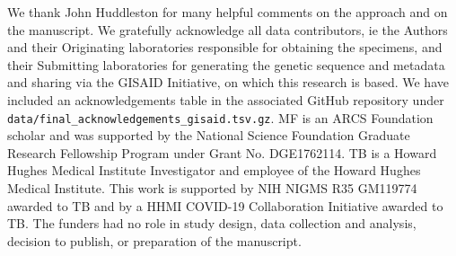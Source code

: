 \documentclass[10pt,letterpaper]{article}
\begin{document}
We thank John Huddleston for many helpful comments on the approach and on the manuscript.
We gratefully acknowledge all data contributors, ie the Authors and their Originating laboratories responsible for obtaining the specimens, and their Submitting laboratories for generating the genetic sequence and metadata and sharing via the GISAID Initiative, on which this research is based.
We have included an acknowledgements table in the associated GitHub repository under \texttt{data/final\_acknowledgements\_gisaid.tsv.gz}.
MF is an ARCS Foundation scholar and was supported by the National Science Foundation Graduate Research Fellowship Program under Grant No. DGE1762114.
TB is a Howard Hughes Medical Institute Investigator and employee of the Howard Hughes Medical Institute.
This work is supported by NIH NIGMS R35 GM119774 awarded to TB and by a HHMI COVID-19 Collaboration Initiative awarded to TB. 
The funders had no role in study design, data collection and analysis, decision to publish, or preparation of the manuscript.


\nolinenumbers

%
%
%

%
\end{document}
